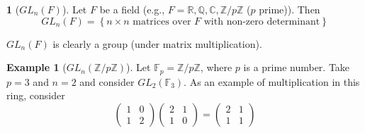 \documentclass[12pt]{article}
\theoremstyle{definition}
\newtheorem{definition}{\color{NavyBlue}{\textbf{Definition}}}
\newcommand{\Z}{\mathbb{Z}}
\newtheorem{example}{\color{WildStrawberry}Example}
\theoremstyle{definition}
\begin{document}
\begin{definition}[$GL_n(F)$]
	Let $F$ be a field (e.g., $F = \mathbb{R}, \mathbb{Q}, \mathbb{C}, \Z / p\Z $ ($p$ prime)). Then
	\begin{equation}
		GL_n(F) = \left\{ n \times n \text{ matrices over $F$ with non-zero determinant}\right\}
	\end{equation}
\end{definition}

$GL_n(F)$ is clearly a group (under matrix multiplication).

\begin{example}[$GL_n(\Z / p\Z)$]
	Let $\mathbb{F}_p = \Z / p\Z $, where $p$ is a prime number. Take $p=3$ and $n=2$ and consider $GL_2(\mathbb{F}_3)$. As an example of multiplication in this ring, consider
	\begin{equation}
		\begin{pmatrix}
		1 & 0 \\
		1 & 2
		\end{pmatrix}
		\begin{pmatrix}
		2 & 1 \\
		1 & 0
		\end{pmatrix}
		=
		\begin{pmatrix}
		2 & 1 \\
		1 & 1
		\end{pmatrix}
	\end{equation}
\end{example}
\end{document}
